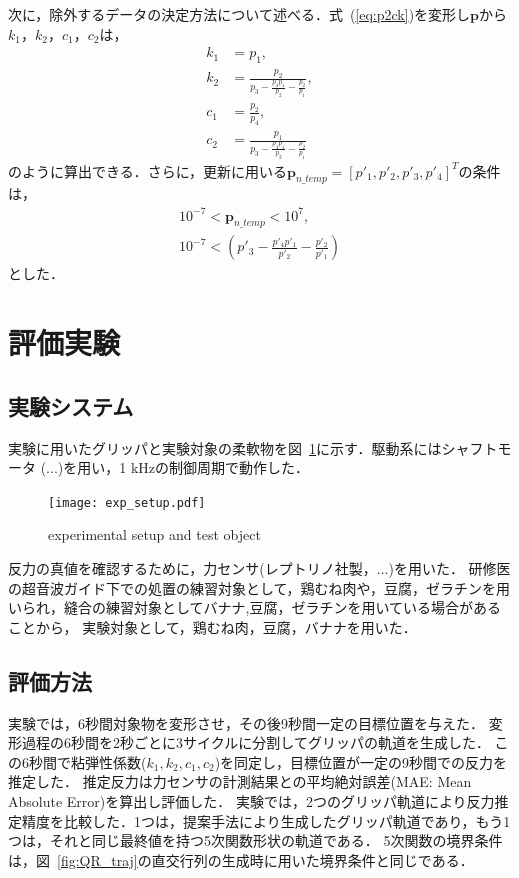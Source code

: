 \documentclass[a4paper]{jarticle}
\begin{document}
次に，除外するデータの決定方法について述べる．式~(\ref{eq:p2ck})を変形し$\mathbf{p}$から$k_1$，$k_2$，$c_1$，$c_2$は，
\begin{equation}
    \begin{aligned}
        k_1 &= p_1 ,\\
        k_2 &= \frac{p_2}{p_3 - \frac{p_4 p_1}{p_2} - \frac{p_2}{p_1}} ,\\
        c_1 &= \frac{p_2}{p_4},\\
        c_2 &= \frac{p_1}{p_3 - \frac{p_4 p_1}{p_2} - \frac{p_2}{p_1}} 
    \end{aligned}
\end{equation}
のように算出できる．さらに，更新に用いる$\mathbf{p}_{n\_temp}=[p'_1,p'_2,p'_3,p'_4]^{T}$の条件は，
\begin{equation}
    \begin{aligned}
        10^{-7} < \mathbf{p}_{n\_temp} < 10^{7} ,\\
        10^{-7} < \left( p'_3 - \frac{p'_4 p'_1}{p'_2} - \frac{p'_2}{p'_1} \right)
    \end{aligned}
\end{equation}
とした．

\section{評価実験}
\subsection{実験システム}
実験に用いたグリッパと実験対象の柔軟物を図~\ref{fig:exp_setup}に示す．{\color{red}駆動系にはシャフトモータ (...)}を用い，1 kHzの制御周期で動作した．
\begin{figure}[htbp]
    \centering
    \texttt{[image: exp\_setup.pdf]}
    \caption{experimental setup and test object}
    \label{fig:exp_setup}
\end{figure}
反力の真値を確認するために，{\color{red}力センサ(レプトリノ社製，...)}を用いた．
研修医の超音波ガイド下での処置の練習対象として，鶏むね肉や，豆腐，ゼラチンを用いられ，縫合の練習対象としてバナナ,豆腐，ゼラチンを用いている場合があることから\cite{exp_ref1}\cite{exp_ref2}\cite{exp_ref3}，
実験対象として，鶏むね肉，豆腐，バナナを用いた．
\subsection{評価方法}
実験では，6秒間対象物を変形させ，その後9秒間一定の目標位置を与えた．
変形過程の6秒間を2秒ごとに3サイクルに分割してグリッパの軌道を生成した．
この6秒間で粘弾性係数($k_1, k_2, c_1, c_2$)を同定し，目標位置が一定の9秒間での反力を推定した．
推定反力は力センサの計測結果との平均絶対誤差(MAE: Mean Absolute Error)を算出し評価した．
実験では，2つのグリッパ軌道により反力推定精度を比較した．1つは，提案手法により生成したグリッパ軌道であり，もう1つは，それと同じ最終値を持つ5次関数形状の軌道である．
5次関数の境界条件は，図~{\ref{fig:QR_traj}}の直交行列の生成時に用いた境界条件と同じである．
\end{document}
